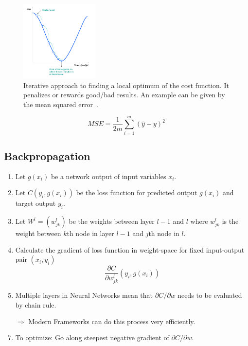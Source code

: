 \begin{frame}{\insertsubsection}
    \begin{figure}
        \centering
        \includegraphics[width=0.35\textwidth]{media/ICLH_Diagram_Batch_01_04-GradientDescent-WHITEBG.png}
        \caption{Iterative approach to finding a local optimum of the cost function.
            It penalizes or rewards good/bad results. An example can be given by the mean squared error~\cite{IBM2020}.}
    \end{figure}
    \begin{equation}
        MSE = \frac{1}{2m}\sum\limits_{i=1}^m(\hat{y}-y)^2
    \end{equation}
\end{frame}
%
%
\subsection{Backpropagation}
\label{subsec:ml-techniques-backpropagation}
\begin{frame}{\insertsubsection}
    \begin{enumerate}[<+->]
        \item Let $g(x_i)$ be a network output of input variables $x_i$.
        \item Let $C(y_i, g(x_i))$ be the loss function for predicted output $g(x_i)$ and target output $y_i$.
        \item Let $W^l=(w^l_{jk})$ be the weights between layer $l-1$ and $l$ where $w^l_{jk}$ is the weight between $k$th node in layer $l-1$ and $j$th node in $l$.
        \item Calculate the gradient of loss function in weight-space for fixed input-output pair $(x_i,y_i)$
        \begin{equation}
            \frac{\partial C}{\partial w^l_{jk}}(y_i, g(x_i))
        \end{equation}
        \item Multiple layers in Neural Networks mean that $\partial C/\partial w$ needs to be evaluated by chain rule.
        \item[$\Rightarrow$] Modern Frameworks can do this process very efficiently.
        \item To optimize: Go along steepest negative gradient of $\partial C/\partial w$.
    \end{enumerate}
\end{frame}